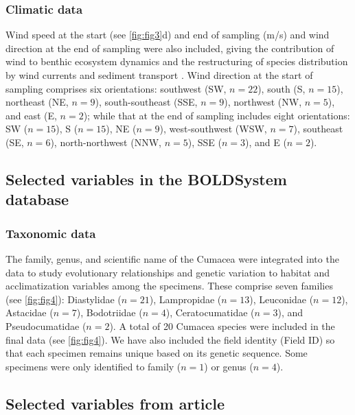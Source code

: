 \subsubsection{Climatic data}
Wind speed at the start (see \autoref{fig:fig3}d) and end of sampling (m/s) and wind direction at the end of sampling were also included, giving the contribution of wind to benthic ecosystem dynamics and the restructuring of species distribution by wind currents and sediment transport \citep{siedlecki2016experiments, waga_recent_2020,saeedi_environmental_2022}. Wind direction at the start of sampling comprises six orientations: southwest (SW, $n=22$), south (S, $n=15$), northeast (NE, $n=9$), south-southeast (SSE, $n=9$), northwest (NW, $n=5$), and east (E, $n=2$); while that at the end of sampling includes eight orientations: SW ($n=15$), S ($n=15$), NE ($n=9$), west-southwest (WSW, $n=7$), southeast (SE, $n=6$), north-northwest (NNW, $n=5$), SSE ($n=3$), and E ($n=2$).

\subsection{Selected variables in the BOLDSystem database}
\subsubsection{Taxonomic data}
The family, genus, and scientific name of the Cumacea were integrated into the data to study evolutionary relationships and genetic variation to habitat and acclimatization variables among the specimens. These comprise seven families (see \autoref{fig:fig4}): Diastylidae ($n=21$), Lampropidae ($n=13$), Leuconidae ($n=12$), Astacidae ($n=7$), Bodotriidae ($n=4$), Ceratocumatidae ($n=3$), and Pseudocumatidae ($n=2$). A total of 20 Cumacea species were included in the final data (see \autoref{fig:fig4}). We have also included the field identity (Field ID) so that each specimen remains unique based on its genetic sequence. Some specimens were only identified to family ($n=1$) or genus ($n=4$).

\subsection{Selected variables from article \cite{uhlir_adding_2021}}
